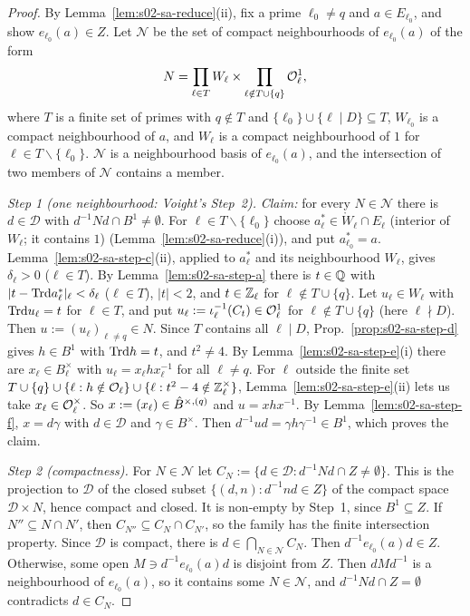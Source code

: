 \begin{proof}
By Lemma~\ref{lem:s02-sa-reduce}(ii), fix a prime $\ell_0\ne q$ and $a\in E_{\ell_0}$, and show $e_{\ell_0}(a)\in Z$. Let $\mathcal N$ be
the set of compact neighbourhoods of $e_{\ell_0}(a)$ of the form
\[N=\prod_{\ell\in T}W_\ell\times\prod_{\ell\notin T\cup\{q\}}\mathcal{O}^1_\ell,\]
where $T$ is a finite set of primes with $q\notin T$ and $\{\ell_0\}\cup\{\ell\mid D\}\subseteq T$, $W_{\ell_0}$ is a compact
neighbourhood of $a$, and $W_\ell$ is a compact neighbourhood of $1$ for $\ell\in T\smallsetminus\{\ell_0\}$. $\mathcal N$ is a
neighbourhood basis of $e_{\ell_0}(a)$, and the intersection of two members of $\mathcal N$ contains a member.

\emph{Step 1 (one neighbourhood: Voight's Step~2).} \emph{Claim:} for every $N\in\mathcal N$ there is $d\in\mathcal D$ with
$d^{-1}Nd\cap B^1\ne\emptyset$. For $\ell\in T\smallsetminus\{\ell_0\}$ choose $a^*_\ell\in\mathring W_\ell\cap E_\ell$ (interior of $W_\ell$; it contains $1$)
(Lemma~\ref{lem:s02-sa-reduce}(i)), and put $a^*_{\ell_0}=a$. Lemma~\ref{lem:s02-sa-step-c}(ii), applied to $a^*_\ell$ and its neighbourhood $W_\ell$, gives $\delta_\ell>0$ ($\ell\in T$). By
Lemma~\ref{lem:s02-sa-step-a} there is $t\in\mathbb{Q}$ with $|t-\mathrm{Trd} a^*_\ell|_\ell<\delta_\ell$ ($\ell\in T$), $|t|<2$, and $t\in\mathbb{Z}_\ell$
for $\ell\notin T\cup\{q\}$. Let $u_\ell\in W_\ell$ with $\mathrm{Trd} u_\ell=t$ for $\ell\in T$, and put $u_\ell:=\iota_\ell^{-1}(C_t)\in\mathcal{O}^1_\ell$
for $\ell\notin T\cup\{q\}$ (here $\ell\nmid D$). Then $u:=(u_\ell)_{\ell\ne q}\in N$. Since $T$ contains all $\ell\mid D$,
Prop.~\ref{prop:s02-sa-step-d} gives $h\in B^1$ with $\mathrm{Trd} h=t$, and $t^2\ne4$. By Lemma~\ref{lem:s02-sa-step-e}(i) there are
$x_\ell\in B_\ell^\times$ with $u_\ell=x_\ell hx_\ell^{-1}$ for all $\ell\ne q$. For $\ell$ outside the finite set
$T\cup\{q\}\cup\{\ell:h\notin\mathcal{O}_\ell\}\cup\{\ell:t^2-4\notin\mathbb{Z}_\ell^\times\}$, Lemma~\ref{lem:s02-sa-step-e}(ii) lets us take
$x_\ell\in\mathcal{O}^\times_\ell$. So $x:=(x_\ell)\in\hat{B}^{\times,(q)}$ and $u=xhx^{-1}$. By Lemma~\ref{lem:s02-sa-step-f}, $x=d\gamma$ with
$d\in\mathcal D$ and $\gamma\in B^\times$. Then $d^{-1}ud=\gamma h\gamma^{-1}\in B^1$, which proves the claim.

\emph{Step 2 (compactness).} For $N\in\mathcal N$ let $C_N:=\{d\in\mathcal D:d^{-1}Nd\cap Z\ne\emptyset\}$. This is the projection to
$\mathcal D$ of the closed subset $\{(d,n):d^{-1}nd\in Z\}$ of the compact space $\mathcal D\times N$, hence compact and closed. It is
non-empty by Step~1, since $B^1\subseteq Z$. If $N''\subseteq N\cap N'$, then $C_{N''}\subseteq C_N\cap C_{N'}$, so the family has the
finite intersection property. Since $\mathcal D$ is compact, there is $d\in\bigcap_{N\in\mathcal N}C_N$. Then
$d^{-1}e_{\ell_0}(a)d\in Z$. Otherwise, some open $M\ni d^{-1}e_{\ell_0}(a)d$ is disjoint from $Z$. Then $dMd^{-1}$ is a
neighbourhood of $e_{\ell_0}(a)$, so it contains some $N\in\mathcal N$, and $d^{-1}Nd\cap Z=\emptyset$ contradicts $d\in C_N$.


\end{proof}
